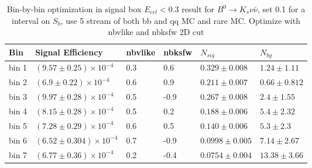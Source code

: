 \begin{table}[h]
\small
\begin{center}
\begin{tabular}{ |p{0.8cm}||p{3.7cm}||p{1.2cm}||p{1.2cm}||p{2.6cm}||p{2.7cm}| }
\hline
 Bin & Signal Efficiency & nbvlike & nbksfw & $N_{sig}$ & $N_{bg}$  \\
 \hline
 bin 1  & $(9.57 \pm 0.25) \times 10^{-4}$ &0.3&0.6&$0.329\pm 0.008 $  &$1.24\pm 1.11 $\\ %
 \hline
 bin 2  & $(6.9 \pm 0.22)\times 10^{-4}$ &0.6& 0.9&$0.211 \pm 0.007 $&$0.66\pm 0.812 $\\ %
 \hline
 bin 3  & $(9.97 \pm 0.28)\times 10^{-4}$ &0.5&-0.9&$0.267 \pm 0.008 $&$2.4\pm 1.55 $\\ %
 \hline
 bin 4  & $(8.15\pm 0.28)\times 10^{-4}$ &0.5&0.2&$0.188 \pm 0.006 $&$5.4\pm 2.32 $ \\ %
 \hline
 bin 5  & $(7.28\pm 0.29) \times 10^{-4}$ &0.6& 0.5&$0.140 \pm 0.006 $&$5.3\pm 2.3 $ \\ %
 \hline
 bin 6  & $(6.52\pm 0.304) \times 10^{-4}$ &0.7& -0.9&$0.0998\pm 0.005 $&$7.14 \pm 2.67 $\\ %
 \hline
 bin 7  & $(6.77 \pm 0.36)\times 10^{-4}$ &0.2&-0.4&$0.0754 \pm 0.004 $&$ 13.38\pm 3.66 $ \\ %
 \hline
 \hline
\end{tabular}
\caption{Bin-by-bin optimization in signal box $E_{ecl} < 0.3$ result for $B^0 \rightarrow K_s \nu \bar{\nu}$, set 0.1 for a interval on $S_b$, use 5 stream of both bb and qq MC and rare MC. Optimize with nbvlike and nbksfw 2D cut } \label{t:optks}
\end{center}
\end{table}

